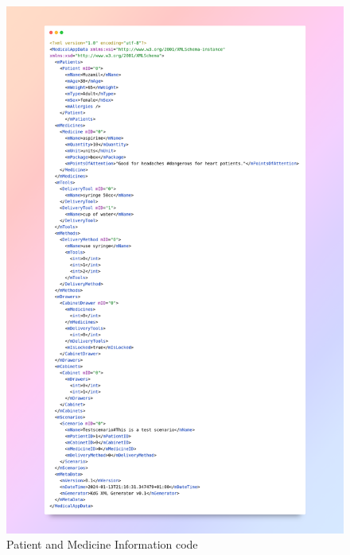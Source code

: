 \begin{figure}[ht]
	\centering
	\includegraphics[width=1\linewidth, height=1.6\linewidth]{Images/medicines.png}
	\caption{Patient and Medicine Information code}
\end{figure}
